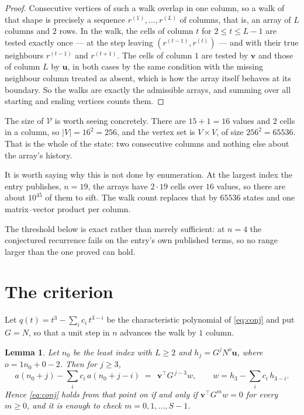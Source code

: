 \documentclass[11pt,a4paper]{article}
\theoremstyle{plain}
\newtheorem{lemma}[theorem]{Lemma}
\theoremstyle{definition}
\begin{document}
\begin{proof}
Consecutive vertices of such a walk overlap in one column, so a walk of that shape is
precisely a sequence $r^{(1)},\dots,r^{(L)}$ of columns, that is, an array of $L$ columns
and $2$ rows. In the walk, the cells of column $t$ for $2\le t\le L-1$ are tested
exactly once --- at the step leaving $(r^{(t-1)},r^{(t)})$ --- and with their true
neighbours $r^{(t-1)}$ and $r^{(t+1)}$. The cells of column $1$ are tested by
$\mathbf{v}$ and those of column $L$ by $\mathbf{u}$, in both cases by the same condition
with the missing neighbour column treated as absent, which is how the array itself behaves at
its boundary. So the walks are exactly the admissible arrays, and summing over all starting
and ending vertices counts them.
\end{proof}


The size of $\mathcal V$ is worth seeing concretely. There are $15+1=16$ values
and $2$ cells in a column, so $|V|=16^{2}=256$, and the vertex set is
$V\times V$, of size $256^2=65536$. That is the whole of the state: two consecutive
columns and nothing else about the array's history.

It is worth saying why this is not done by enumeration. At the largest index the entry
publishes, $n=19$, the arrays have $2\cdot19$ cells over
$16$ values, so there are about $10^{45}$ of them to sift. The
walk count replaces that by $65536$ states and one matrix--vector product per column.

The threshold below is exact rather than merely sufficient: at $n=4$ the conjectured
recurrence fails on the entry's own published terms, so no range larger than the one proved
can hold.
\section{The criterion}

Let $q(t)=t^{3}-\sum_i c_i\,t^{3-i}$ be the characteristic polynomial of
\eqref{eq:conj} and put $G=N$, so that a unit step in $n$ advances the walk by
$1$ column.

\begin{lemma}\label{lem:crit}
Let $n_0$ be the least index with $L\ge2$ and $h_j=G^{j}N^{o}\mathbf{u}$, where
$o=1n_0+0-2$. Then for $j\ge3$,
\[
a(n_0+j)-\sum_i c_i\,a(n_0+j-i)\;=\;\,\mathbf{v}^{\!\top}G^{\,j-3}w,
\qquad w=h_{3}-\sum_i c_i\,h_{3-i} .
\]
Hence \eqref{eq:conj} holds from that point on if and only if
$\mathbf{v}^{\!\top}G^{m}w=0$ for every $m\ge0$, and it is enough to check
$m=0,1,\dots,S-1$.
\end{lemma}
\end{document}
